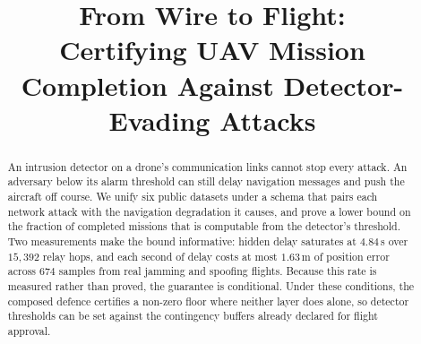 \newtheorem{theorem}{Theorem}
\newtheorem{lemma}{Lemma}
\newtheorem{definition}{Definition}
\newtheorem{proposition}{Proposition}

\newcommand{\fc}[1]{{\color{red}{FC: #1}}}




\title{From Wire to Flight:\\ Certifying UAV Mission Completion Against Detector-Evading Attacks}


\ifanon
  \author{
  }
\else
  \author{
  }
\fi

\maketitle



\begin{abstract}
An intrusion detector on a drone's communication links cannot stop every attack.
An adversary below its alarm threshold can still delay navigation
messages and push the aircraft off course. We unify six public datasets under a
schema that pairs each network attack with the navigation degradation it
causes, and prove a lower bound on the fraction of completed missions that is
computable from the detector's threshold. Two measurements make the bound
informative: hidden delay saturates at $4.84$\,s over $15{,}392$ relay hops,
and each second of delay costs at most $1.63$\,m of position error across $674$
samples from real jamming and spoofing flights. Because this rate is measured
rather than proved, the guarantee is conditional. Under these conditions,
the composed defence certifies a non-zero floor where neither layer does alone,
so detector thresholds can be set against the contingency buffers already
declared for flight approval.
\end{abstract}

